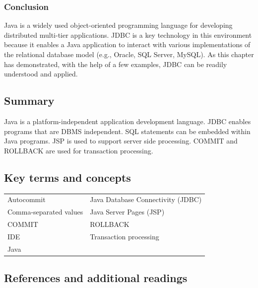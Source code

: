 \documentclass[
]{article}
\begin{document}
\hypertarget{conclusion-5}{%
\subsubsection*{Conclusion}\label{conclusion-5}}

Java is a widely used object-oriented programming language for
developing distributed multi-tier applications. JDBC is a key technology
in this environment because it enables a Java application to interact
with various implementations of the relational database model (e.g.,
Oracle, SQL Server, MySQL). As this chapter has demonstrated, with the
help of a few examples, JDBC can be readily understood and applied.

\hypertarget{summary-14}{%
\subsection*{Summary}\label{summary-14}}

Java is a platform-independent application development language. JDBC
enables programs that are DBMS independent. SQL statements can be
embedded within Java programs. JSP is used to support server side
processing. COMMIT and ROLLBACK are used for transaction processing.

\hypertarget{key-terms-and-concepts-10}{%
\subsection*{Key terms and concepts}\label{key-terms-and-concepts-10}}

\begin{longtable}[]{@{}ll@{}}
\toprule
& \\
\midrule
\endhead
Autocommit & Java Database Connectivity (JDBC) \\
Comma-separated values & Java Server Pages (JSP) \\
COMMIT & ROLLBACK \\
IDE & Transaction processing \\
Java & \\
\bottomrule
\end{longtable}

\hypertarget{references-and-additional-readings-7}{%
\subsection*{References and additional readings}\label{references-and-additional-readings-7}}
\end{document}
